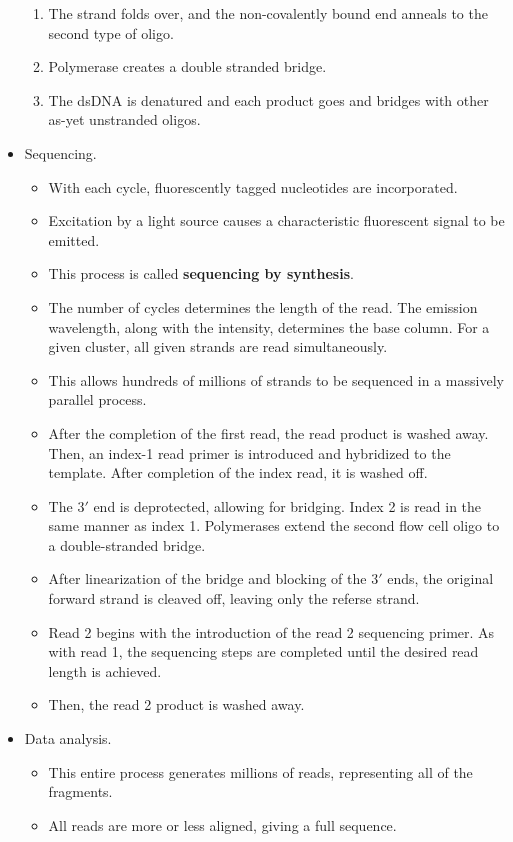 \documentclass[../notes.tex]{subfiles}
\begin{document}
\begin{itemize}
\begin{enumerate}
        \item The strand folds over, and the non-covalently bound end anneals to the second type of oligo.
        \item Polymerase creates a double stranded bridge.
        \item The dsDNA is denatured and each product goes and bridges with other as-yet unstranded oligos.
    \end{enumerate}
    \item Sequencing.
    \begin{itemize}
        \item With each cycle, fluorescently tagged nucleotides are incorporated.
        \item Excitation by a light source causes a characteristic fluorescent signal to be emitted.
        \item This process is called \textbf{sequencing by synthesis}.
        \item The number of cycles determines the length of the read. The emission wavelength, along with the intensity, determines the base column. For a given cluster, all given strands are read simultaneously.
        \item This allows hundreds of millions of strands to be sequenced in a massively parallel process.
        \item After the completion of the first read, the read product is washed away. Then, an index-1 read primer is introduced and hybridized to the template. After completion of the index read, it is washed off.
        \item The $3'$ end is deprotected, allowing for bridging. Index 2 is read in the same manner as index 1. Polymerases extend the second flow cell oligo to a double-stranded bridge.
        \item After linearization of the bridge and blocking of the $3'$ ends, the original forward strand is cleaved off, leaving only the referse strand.
        \item Read 2 begins with the introduction of the read 2 sequencing primer. As with read 1, the sequencing steps are completed until the desired read length is achieved.
        \item Then, the read 2 product is washed away.
    \end{itemize}
    \item Data analysis.
    \begin{itemize}
        \item This entire process generates millions of reads, representing all of the fragments.
        \item All reads are more or less aligned, giving a full sequence.
    \end{itemize}
\end{itemize}
\end{document}
